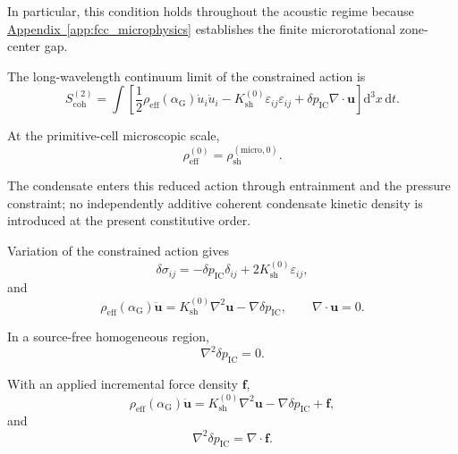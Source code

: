 In particular, this condition holds throughout the acoustic regime because \hyperref[app:fcc_microphysics]{Appendix~\ref*{app:fcc_microphysics}} establishes the finite microrotational zone-center gap.

The long-wavelength continuum limit of the constrained action is
\begin{equation}
    S_{\mathrm{coh}}^{(2)}
    =
    \int
    \left[
        \frac{1}{2}
        \rho_{\mathrm{eff}}(\alpha_{\mathrm{G}})
        \dot{u}_i\dot{u}_i
        -
        K_{\mathrm{sh}}^{(0)}
        \varepsilon_{ij}\varepsilon_{ij}
        +
        \delta p_{\mathrm{IC}}
        \nabla\cdot\mathbf{u}
    \right]
    \mathrm{d}^3x\,\mathrm{d}t.
\end{equation}

At the primitive-cell microscopic scale,
\begin{equation}
    \rho_{\mathrm{eff}}^{(0)}
    =
    \rho_{\mathrm{sh}}^{(\mathrm{micro},0)}.
\end{equation}

The condensate enters this reduced action through entrainment and the pressure constraint; no independently additive coherent condensate kinetic density is introduced at the present constitutive order.

Variation of the constrained action gives
\begin{equation}
    \delta\sigma_{ij}
    =
    -\delta p_{\mathrm{IC}}\delta_{ij}
    +
    2K_{\mathrm{sh}}^{(0)}
    \varepsilon_{ij},
\end{equation}
and
\begin{equation}
    \rho_{\mathrm{eff}}(\alpha_{\mathrm{G}})
    \ddot{\mathbf{u}}
    =
    K_{\mathrm{sh}}^{(0)}
    \nabla^2\mathbf{u}
    -
    \nabla\delta p_{\mathrm{IC}},
    \qquad
    \nabla\cdot\mathbf{u}=0.
\end{equation}

In a source-free homogeneous region,
\begin{equation}
    \nabla^2\delta p_{\mathrm{IC}}
    =
    0.
\end{equation}

With an applied incremental force density $\mathbf{f}$,
\begin{equation}
    \rho_{\mathrm{eff}}(\alpha_{\mathrm{G}})
    \ddot{\mathbf{u}}
    =
    K_{\mathrm{sh}}^{(0)}
    \nabla^2\mathbf{u}
    -
    \nabla\delta p_{\mathrm{IC}}
    +
    \mathbf{f},
\end{equation}
and
\begin{equation}
    \nabla^2\delta p_{\mathrm{IC}}
    =
    \nabla\cdot\mathbf{f}.
\end{equation}

